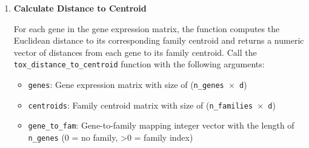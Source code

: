 \documentclass[11pt]{article}
\begin{document}
\begin{enumerate}
    \textbf{Arguments:}
    \begin{itemize}
        \item \texttt{expression\_vectors}: Matrix of size \texttt{(n\_axes\_genes × n\_vectors)} where each column is a gene expression vector
        \item \texttt{family\_centroids}: Matrix of size \texttt{(n\_axes\_centroids × n\_families)} where each column is a family centroid vector
        \item \texttt{gene\_to\_centroid}: Integer vector of length \texttt{n\_vectors} containing 1-based family indices mapping each gene to its centroid
    \end{itemize}
    \textbf{Returns:}
    \begin{itemize}
        \item \texttt{shift\_vectors}: Matrix of size \texttt{(2*n\_axes\_genes × n\_vectors)} containing centroids (rows 1:n\_axes\_genes) and shift vectors (rows (n\_axes\_genes+1):(2*n\_axes\_genes))
    \end{itemize}
    \begin{lstlisting}[language=R, caption={R Shift Vector Field Computation}]
shift_vectors <- tox_compute_shift_vector_field(expression_vectors, 
    family_centroids, gene_to_centroid)
    \end{lstlisting}          
    
	\item \textbf{Calculate Distance to Centroid}
	      
	      For each gene in the gene expression matrix, the function computes the
	      Euclidean distance to its corresponding family centroid and returns a
	      numeric vector of distances from each gene to its family centroid. Call the
	      \texttt{tox\_distance\_to\_centroid} function with the following arguments:
	      
	      \begin{itemize}
	      	\item \texttt{genes}: Gene expression matrix with size of (\texttt{n\_genes
	      	      $\times$ d})
	      	
	      	\item \texttt{centroids}: Family centroid matrix with size of (\texttt{n\_families
	      	      $\times$ d})
	      	
	      	\item \texttt{gene\_to\_fam}: Gene-to-family mapping integer vector with
	      	      the length of \texttt{n\_genes} (0 = no family, \textgreater 0 =
	      	      family index)
	      	      

\end{itemize}
\end{enumerate}
\end{document}
